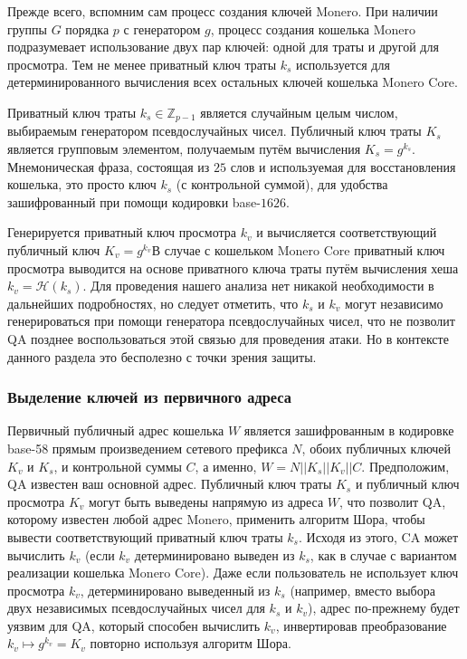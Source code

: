 \documentclass{mrl}
\begin{document}
Прежде всего, вспомним сам процесс создания ключей Monero. При наличии группы $G$ порядка $p$ с генератором $g$, процесс создания кошелька Monero подразумевает использование двух пар ключей: одной для траты и другой для просмотра. Тем не менее приватный ключ траты $k_s$ используется для детерминированного вычисления всех остальных ключей кошелька Monero Core. 

Приватный ключ траты $k_s \in \mathbb{Z}_{p-1}$ является случайным целым числом, выбираемым генератором псевдослучайных чисел. Публичный ключ траты $K_s$ является групповым элементом, получаемым путём вычисления $K_s = g^{k_s}$. Мнемоническая фраза, состоящая из $25$ слов и используемая для восстановления кошелька, это просто ключ $k_s$ (с контрольной суммой), для удобства зашифрованный при помощи кодировки base-$1626$.

Генерируется приватный ключ просмотра $k_v$ и вычисляется соответствующий публичный ключ $K_v = g^{k_v}$В случае с кошельком Monero Core приватный ключ просмотра выводится на основе приватного ключа траты путём вычисления хеша $k_v = \mathcal{H}(k_s)$. Для проведения нашего анализа нет никакой необходимости в дальнейших подробностях, но следует отметить, что $k_s$ и $k_v$ могут независимо генерироваться при помощи генератора псевдослучайных чисел, что не позволит QA позднее воспользоваться этой связью для проведения атаки. Но в контексте данного раздела это бесполезно с точки зрения защиты.

\subsubsection{Выделение ключей из первичного адреса}\label{sec_key_derivation}


Первичный публичный адрес кошелька $W$ является зашифрованным в кодировке base-58 прямым произведением сетевого префикса $N$, обоих публичных ключей $K_v$ и $K_s$, и контрольной суммы $C$, а именно, $W = N || K_s || K_v || C$. Предположим, QA известен ваш основной адрес. Публичный ключ траты $K_s$ и публичный ключ просмотра $K_v$ могут быть выведены напрямую из адреса $W$, что позволит QA, которому известен любой адрес Monero, применить алгоритм Шора, чтобы вывести соответствующий приватный ключ траты $k_s$. Исходя из этого, CA может вычислить $k_v$ (если $k_v$ детерминировано выведен из $k_s$, как в случае с вариантом реализации кошелька Monero Core). Даже если пользователь не использует ключ просмотра $k_v$, детерминировано выведенный из $k_s$ (например, вместо выбора двух независимых псевдослучайных чисел для $k_s$ и $k_v$), адрес по-прежнему будет уязвим для QA, который способен вычислить $k_v$, инвертировав преобразование $k_v \mapsto g^{k_v} = K_v$ повторно используя алгоритм Шора.
\end{document}
